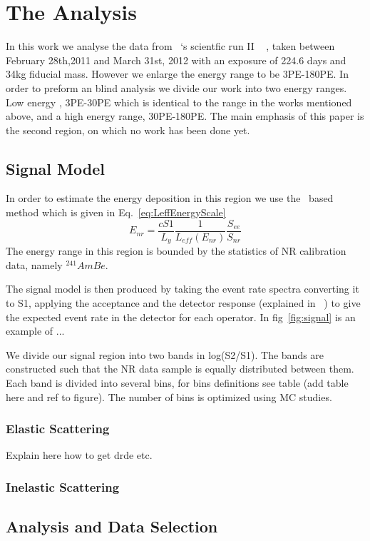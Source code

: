 \section{The Analysis}
In this work we analyse the data from \Xehund\ `s scientfic run II ~\cite{xe100_run10_si,xe100_run10_sd} , taken between February 28th,2011 and March 31st, 2012 with an exposure of 224.6 days and 34kg fiducial mass.  However we enlarge the energy range to be 3PE-180PE. In order to preform an blind analysis we divide our work into two energy ranges. Low energy , 3PE-30PE which is identical to the range in the works mentioned above, and a high energy range, 30PE-180PE. The main emphasis of this paper is the second region, on which no work has been done yet.
\subsection{Signal Model}

In order to estimate the energy deposition in this region we use the \Leff\ based method which is given in Eq.~\ref{eq:LeffEnergyScale}
\begin{equation}
\label{eq:LeffEnergyScale}
	E_{nr} = \frac{cS1}{L_y} \frac{1}{L_{eff}(E_{nr})} \frac{S_{ee}}{S_{nr}}
\end{equation}
The energy range in this region is bounded by the statistics of NR calibration data, namely $^{241}AmBe$.

The signal model is then produced by taking the event rate spectra converting it to S1, applying the acceptance and the detector response (explained in ~\cite{xe100_ana2012}) to give the expected event rate in the detector for each operator. In fig~\ref{fig:signal} is an example of ...

We divide our signal region into two bands in log(S2/S1). The bands are constructed such that the NR data sample is equally distributed between them. Each band is divided into several bins, for bins definitions see table (add table here and ref to figure). The number of bins is optimized using MC studies.


\subsubsection{Elastic Scattering}
Explain here how to get drde etc.
\subsubsection{Inelastic Scattering}
\subsection{Analysis and Data Selection}
